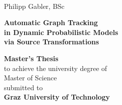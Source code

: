 

\begin{titlingpage}


%

\begin{center}
~
\vfill\vfill\vfill

\sffamily

Philipp Gabler, BSc

\vfill

\begin{Spacing}{1.1}
\LARGE\bfseries Automatic Graph Tracking \\ in Dynamic Probabilistic Models \\ via Source
Transformations
\end{Spacing}


\vfill\vfill\vfill\vfill

{\normalsize\bfseries Master's Thesis}\\
\vfill
to achieve the university degree of\\
{Master of Science}\\
\vfill
submitted to\\
{\normalsize\bfseries Graz University of Technology}


\end{center}
\end{titlingpage}

